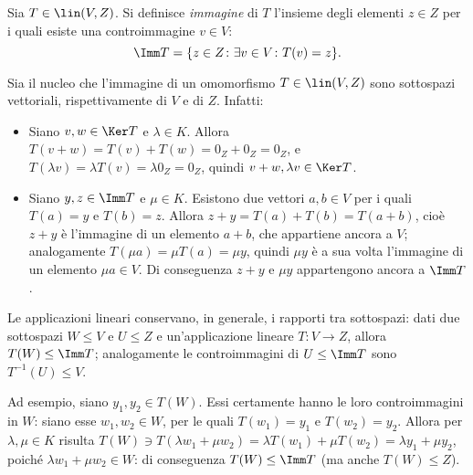 \begin{definizione} \label{d:immagine-applicazione-lineare}
	Sia $T\in\lin(V,Z)$.
	Si definisce \emph{immagine} di $T$ l'insieme degli elementi $z\in Z$ per i quali esiste una controimmagine $v\in V$:
	\begin{equation*}
		\Imm T=\{z\in Z\colon\exists v\in V\colon T(v)=z\}.
	\end{equation*}
\end{definizione}
Sia il nucleo che l'immagine di un omomorfismo $T\in\lin(V,Z)$ sono sottospazi vettoriali, rispettivamente di $V$ e di $Z$.
Infatti:
\begin{itemize}
	\item Siano $v,w\in\Ker T$ e $\lambda \in K$.
		Allora $T(v+w)=T(v)+T(w)=0_Z+0_Z=0_Z$, e $T(\lambda v)=\lambda T(v)=\lambda 0_Z=0_Z$, quindi $v+w,\lambda v\in\Ker T$.
	\item Siano $y,z\in\Imm T$ e $\mu\in K$.
		Esistono due vettori $a,b\in V$ per i quali $T(a)=y$ e $T(b)=z$.
		Allora $z+y=T(a)+T(b)=T(a+b)$, cioè $z+y$ è l'immagine di un elemento $a+b$, che appartiene ancora a $V$; analogamente $T(\mu a)=\mu T(a)=\mu y$, quindi $\mu y$ è a sua volta l'immagine di un elemento $\mu a\in V$.
		Di conseguenza $z+y$ e $\mu y$ appartengono ancora a $\Imm T$.
\end{itemize}

\begin{osservazione} \label{o:applicazioni-sottospazi}
	Le applicazioni lineari conservano, in generale, i rapporti tra sottospazi: dati due sottospazi $W\le V$ e $U\le Z$ e un'applicazione lineare $T\colon V\to Z$, allora $T(W)\leq \Imm T$; analogamente le controimmagini di $U\le \Imm T$ sono $T^{-1}(U)\leq V$.

	Ad esempio, siano $y_1,y_2\in T(W)$.
	Essi certamente hanno le loro controimmagini in $W$: siano esse $w_1,w_2\in W$, per le quali $T(w_1)=y_1$ e $T(w_2)=y_2$.
	Allora per $\lambda,\mu\in K$ risulta $T(W)\ni T(\lambda w_1+\mu w_2)=\lambda T(w_1)+\mu T(w_2)=\lambda y_1+\mu y_2$, poiché $\lambda w_1+\mu w_2\in W$: di conseguenza $T(W)\le\Imm T$ (ma anche $T(W)\le Z$).
\end{osservazione}

